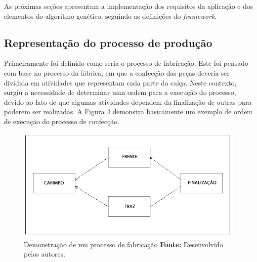 \begin{itemize}
	
	
	
\end{itemize}

\par As próximas seções apresentam a implementação dos requisitos da aplicação
e dos elementos do algoritmo genético, seguindo as definições do \textit{framework}.

\subsection{Representação do processo de produção}

\par Primeiramente foi definido como seria o processo de fabricação. Este foi pensado com base no 
processo da fábrica, em que a confecção das peças deveria ser dividida em atividades que representam
cada parte da calça. Neste contexto, surgiu a necessidade de determinar uma ordem para a execução do processo, 
devido ao fato de que algumas atividades dependem da finalização de outras para poderem ser
realizadas. A Figura 4 demonstra basicamente um exemplo de ordem de execução do
processo de confecção.

\newpage

\begin{figure}[h!]
	\centerline{\includegraphics[scale=0.5]{./imagens/processo1.png}}
	\caption[Demonstração de um processo de fabricação]
	{Demonstração de um processo de fabricação \textbf{Fonte:} Desenvolvido pelos
	autores.}
	\label{fig:exemplo1}
\end{figure}

